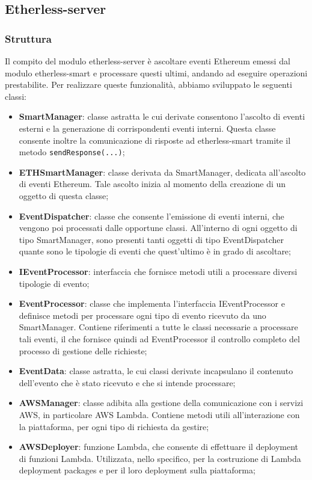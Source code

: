 \subsection{Etherless-server}
\subsubsection{Struttura}
Il compito del modulo etherless-server è ascoltare eventi Ethereum emessi dal modulo etherless-smart e processare questi ultimi, andando ad eseguire operazioni prestabilite. Per realizzare queste funzionalità, abbiamo sviluppato le seguenti classi:
\begin{itemize}
	\item \textbf{SmartManager}: classe astratta le cui derivate consentono l'ascolto di eventi esterni e la generazione di corrispondenti eventi interni. Questa classe consente inoltre la comunicazione di risposte ad etherless-smart tramite il metodo \texttt{sendResponse(...)};
	\item \textbf{ETHSmartManager}: classe derivata da SmartManager, dedicata all'ascolto di eventi Ethereum. Tale ascolto inizia al momento della creazione di un oggetto di questa classe;
	\item \textbf{EventDispatcher}: classe che consente l'emissione di eventi interni, che vengono poi processati dalle opportune classi. All'interno di ogni oggetto di tipo SmartManager, sono presenti tanti oggetti di tipo EventDispatcher quante sono le tipologie di eventi che quest'ultimo è in grado di ascoltare;
	\item \textbf{IEventProcessor}: interfaccia che fornisce metodi utili a processare diversi tipologie di evento;
	\item \textbf{EventProcessor}: classe che implementa l'interfaccia IEventProcessor e definisce metodi per processare ogni tipo di evento ricevuto da uno SmartManager. Contiene riferimenti a tutte le classi necessarie a processare tali eventi, il che fornisce quindi ad EventProcessor il controllo completo del processo di gestione delle richieste;
	\item \textbf{EventData}: classe astratta, le cui classi derivate incapsulano il contenuto dell'evento che è stato ricevuto e che si intende processare;
	\item \textbf{AWSManager}: classe adibita alla gestione della comunicazione con i servizi AWS, in particolare AWS Lambda. Contiene metodi utili all'interazione con la piattaforma, per ogni tipo di richiesta da gestire;
	\item \textbf{AWSDeployer}: funzione Lambda, che consente di effettuare il deployment di funzioni Lambda. Utilizzata, nello specifico, per la costruzione di Lambda deployment packages e per il loro deployment sulla piattaforma;

\end{itemize}

